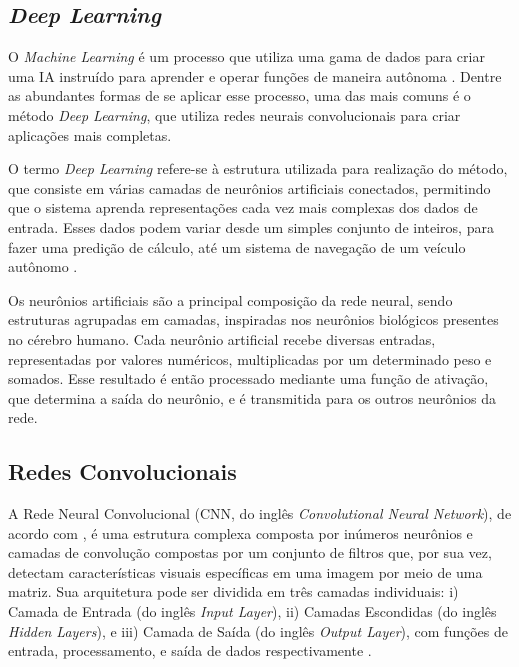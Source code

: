 
\subsection{\esp \textit{Deep Learning}} \label{deeplearning}

O \textit{Machine Learning} é um processo que utiliza uma gama de dados para criar uma IA instruído para aprender e operar funções de maneira autônoma \cite{machinelearning}. Dentre as abundantes formas de se aplicar esse processo, uma das mais comuns é o método \textit{Deep Learning}, que utiliza redes neurais convolucionais para criar aplicações mais completas. 

O termo \textit{Deep Learning} refere-se à estrutura utilizada para realização do método, que consiste em várias camadas de neurônios artificiais conectados, permitindo que o sistema aprenda representações cada vez mais complexas dos dados de entrada. Esses dados podem variar desde um simples conjunto de inteiros, para fazer uma predição de cálculo, até um sistema de navegação de um veículo autônomo \cite{deeplearning}.

Os neurônios artificiais são a principal composição da rede neural, sendo estruturas agrupadas em camadas, inspiradas nos neurônios biológicos presentes no cérebro humano. Cada neurônio artificial recebe diversas entradas, representadas por valores numéricos, multiplicadas por um determinado peso e somados. Esse resultado é então processado mediante uma função de ativação, que determina a saída do neurônio, e é transmitida para os outros neurônios da rede.





\subsection{\esp Redes Convolucionais} \label{redesneurais}

A Rede Neural Convolucional (CNN, do inglês \textit{Convolutional Neural Network}), de acordo com , é uma estrutura complexa composta por inúmeros neurônios e camadas de convolução compostas por um conjunto de filtros que, por sua vez, detectam características visuais específicas em uma imagem por meio de uma matriz. Sua arquitetura pode ser dividida em três camadas individuais: i) Camada de Entrada (do inglês \textit{Input Layer}), ii) Camadas Escondidas (do inglês \textit{Hidden Layers}), e iii) Camada de Saída (do inglês \textit{Output Layer}), com funções de entrada, processamento, e saída de dados respectivamente \cite{medical}.

